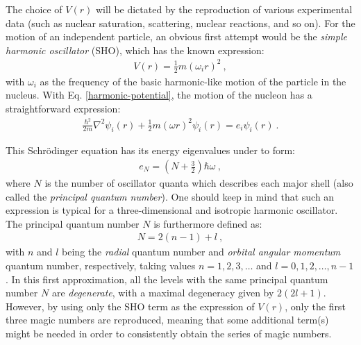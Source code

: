 The choice of $V(r)$ will be dictated by the reproduction of various experimental data (such as nuclear saturation, scattering, nuclear reactions, and so on). For the motion of an independent particle, an obvious first attempt would be the \emph{simple harmonic oscillator} (SHO), which has the known expression:
\begin{align}
    V(r)=\frac{1}{2}m(\omega_i r)^2\ ,
    \label{harmonic-potential}
\end{align}
with $\omega_i$ as the frequency of the basic harmonic-like motion of the particle in the nucleus. With Eq. \ref{harmonic-potential}, the motion of the nucleon has a straightforward expression:
\begin{align}
    \frac{\hbar^2}{2m}\nabla^2\psi_i(r)+\frac{1}{2}m(\omega r)^2\psi_i(r)=e_i\psi_i(r)\ .
\end{align}

This Schrödinger equation has its energy eigenvalues under to form:
\begin{align}
    e_N=\left(N+\frac{3}{2}\right)\hbar\omega\ ,
\end{align}
where $N$ is the number of oscillator quanta which describes each major shell (also called the \emph{principal quantum number}). One should keep in mind that such an expression is typical for a three-dimensional and isotropic harmonic oscillator. The principal quantum number $N$ is furthermore defined as:
\begin{align}
    N=2(n-1)+l\ ,
\end{align}
with $n$ and $l$ being the \emph{radial} quantum number and \emph{orbital angular momentum} quantum number, respectively, taking values $n=1,2,3,\dots$ and $l=0,1,2,\dots,n-1$. In this first approximation, all the levels with the same principal quantum number $N$ are \emph{degenerate}, with a maximal degeneracy given by $2(2l+1)$. However, by using only the SHO term as the expression of $V(r)$, only the first three magic numbers are reproduced, meaning that some additional term(s) might be needed in order to consistently obtain the series of magic numbers.

